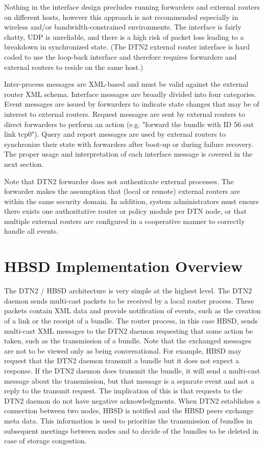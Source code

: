 Nothing in the interface design precludes running forwarders and external routers on different hosts, however this approach is not recommended especially in wireless and/or bandwidth-constrained environments. The interface is fairly chatty, UDP is unreliable, and there is a high risk of packet loss leading to a breakdown in synchronized state. (The DTN2 external router interface is hard coded to use the loop-back interface and therefore requires forwarders and external routers to reside on the same host.)

Inter-process messages are XML-based and must be valid against the external router XML schema. Interface messages are broadly divided into four categories. Event messages are issued by forwarders to indicate state changes that may be of interest to external routers. Request messages are sent by external routers to direct forwarders to perform an action (e.g. "forward the bundle with ID 56 out link tcp0"). Query and report messages are used by external routers to synchronize their state with forwarders after boot-up or during failure recovery. The proper usage and interpretation of each interface message is covered in the next section.

Note that DTN2 forwarder does not authenticate external processes. The forwarder makes the assumption that (local or remote) external routers are within the same security domain. In addition, system administrators must ensure there exists one authoritative router or policy module per DTN node, or that multiple external routers are configured in a cooperative manner to correctly handle all events.


\section{HBSD Implementation Overview}

The DTN2 / HBSD architecture is very simple at the highest level. The DTN2 daemon sends multi-cast packets 
to be received by a local router process. These packets contain XML
data and provide notification of events, such as the creation of a link or the receipt of a bundle.
The router process, in this case HBSD, sends multi-cast XML messages to the DTN2 daemon requesting that
some action be taken, such as the transmission of a bundle. Note that the exchanged messages
are not to be viewed only as being conversational. For example, HBSD may request that the DTN2 daemon
transmit a bundle but it does not expect a response. If the DTN2 daemon does transmit the bundle, it will send
a multi-cast message about the transmission, but that message is a separate event and not a
reply to the transmit request. The implication of this is that requests to the DTN2 daemon do not have negative
acknowledgments. When DTN2 establishes a connection between two nodes, HBSD is notified and the HBSD
peers exchange meta data. This information is used to prioritize the transmission of bundles in
subsequent meetings between nodes and to decide of the bundles to be deleted in case of storage congestion. 

